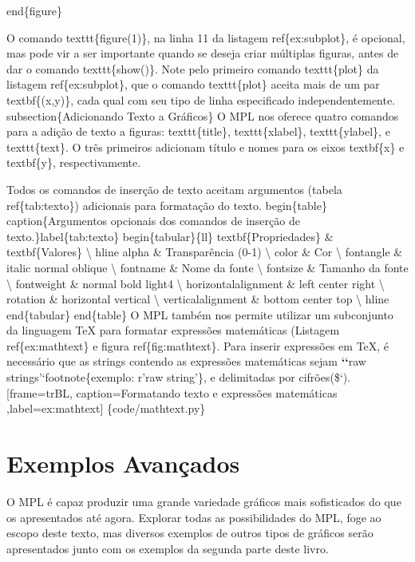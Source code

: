 \documentclass[a4paper,10pt,portuguese]{sphinxmanual}
\begin{document}
end\{figure\}

O comando texttt\{figure(1)\}, na linha 11 da listagem ref\{ex:subplot\}, é opcional, mas pode vir a ser importante quando se deseja criar múltiplas figuras, antes de dar o comando texttt\{show()\}. Note pelo primeiro comando texttt\{plot\} da listagem ref\{ex:subplot\}, que o comando texttt\{plot\} aceita mais de um par textbf\{(x,y)\}, cada qual com seu tipo de linha especificado independentemente.
subsection\{Adicionando Texto a Gráficos\}
O MPL nos oferece quatro comandos para a adição de texto a figuras: texttt\{title\}, texttt\{xlabel\}, texttt\{ylabel\}, e texttt\{text\}. O três primeiros adicionam título e nomes para os eixos textbf\{x\} e textbf\{y\}, respectivamente.

Todos os comandos de inserção de texto aceitam argumentos (tabela ref\{tab:texto\}) adicionais para formatação do texto.
begin\{table\}
caption\{Argumentos opcionais dos comandos de inserção de texto.\}label\{tab:texto\}
begin\{tabular\}\{l\textbar{}l\}
textbf\{Propriedades\} \& textbf\{Valores\} \textbackslash{}
hline
alpha \& Transparência (0-1) \textbackslash{}
color \& Cor \textbackslash{}
fontangle \& italic \textbar{} normal \textbar{} oblique \textbackslash{}
fontname \& Nome da fonte \textbackslash{}
fontsize \& Tamanho da fonte \textbackslash{}
fontweight \& normal \textbar{} bold \textbar{} light4 \textbackslash{}
horizontalalignment \& left \textbar{} center \textbar{} right \textbackslash{}
rotation \& horizontal \textbar{} vertical \textbackslash{}
verticalalignment \& bottom \textbar{} center \textbar{} top \textbackslash{}
hline
end\{tabular\}
end\{table\}
O MPL também nos permite utilizar um subconjunto da linguagem TeX  para formatar expressões matemáticas (Listagem ref\{ex:mathtext\} e figura ref\{fig:mathtext\}. Para inserir expressões em TeX, é necessário que as strings contendo as expressões matemáticas sejam {\color{red}\bfseries{}{}`{}`}raw strings'`footnote\{exemplo: r'raw string'\}, e delimitadas por cifrões(\${}`).
{[}frame=trBL, caption=Formatando texto e expressões matemáticas ,label=ex:mathtext{]} \{code/mathtext.py\}


\chapter{Exemplos Avançados}
\label{Capplot:exemplos-avancados}
O MPL é capaz produzir uma grande variedade gráficos mais
sofisticados do que os apresentados até agora. Explorar todas as
possibilidades do MPL, foge ao escopo deste texto, mas diversos
exemplos de outros tipos de gráficos serão apresentados junto com
os exemplos da segunda parte deste livro.
\end{document}
